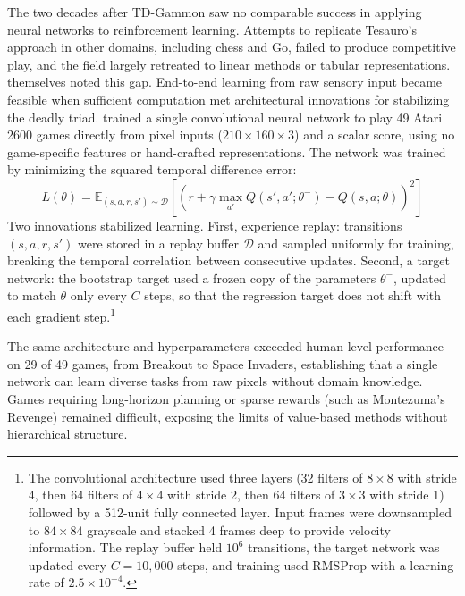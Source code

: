 The two decades after TD-Gammon saw no comparable success in applying neural networks to reinforcement learning. Attempts to replicate Tesauro's approach in other domains, including chess and Go, failed to produce competitive play, and the field largely retreated to linear methods or tabular representations. \citet{mnih2015} themselves noted this gap. End-to-end learning from raw sensory input became feasible when sufficient computation met architectural innovations for stabilizing the deadly triad. \citet{mnih2015} trained a single convolutional neural network to play 49 Atari 2600 games directly from pixel inputs ($210 \times 160 \times 3$) and a scalar score, using no game-specific features or hand-crafted representations. The network was trained by minimizing the squared temporal difference error:
\begin{equation}
L(\theta) = \mathbb{E}_{(s,a,r,s') \sim \mathcal{D}} \left[ \left( r + \gamma \max_{a'} Q(s', a'; \theta^-) - Q(s, a; \theta) \right)^2 \right]
\end{equation}
Two innovations stabilized learning. First, experience replay: transitions $(s, a, r, s')$ were stored in a replay buffer $\mathcal{D}$ and sampled uniformly for training, breaking the temporal correlation between consecutive updates. Second, a target network: the bootstrap target used a frozen copy of the parameters $\theta^-$, updated to match $\theta$ only every $C$ steps, so that the regression target does not shift with each gradient step.\footnote{The convolutional architecture used three layers (32 filters of $8 \times 8$ with stride 4, then 64 filters of $4 \times 4$ with stride 2, then 64 filters of $3 \times 3$ with stride 1) followed by a 512-unit fully connected layer. Input frames were downsampled to $84 \times 84$ grayscale and stacked 4 frames deep to provide velocity information. The replay buffer held $10^6$ transitions, the target network was updated every $C = 10{,}000$ steps, and training used RMSProp with a learning rate of $2.5 \times 10^{-4}$.}

The same architecture and hyperparameters exceeded human-level performance on 29 of 49 games, from Breakout to Space Invaders, establishing that a single network can learn diverse tasks from raw pixels without domain knowledge. Games requiring long-horizon planning or sparse rewards (such as Montezuma's Revenge) remained difficult, exposing the limits of value-based methods without hierarchical structure.

